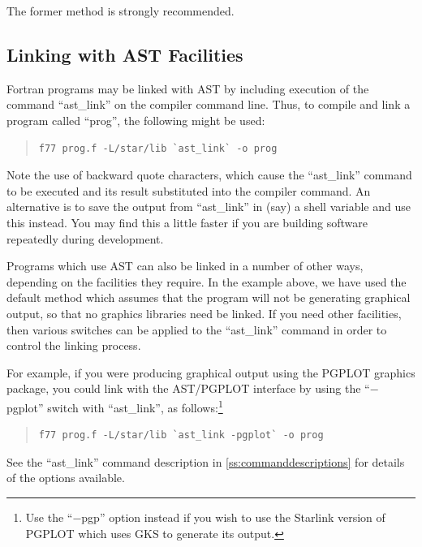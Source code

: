 \documentclass[twoside,11pt]{article}
\newcommand{\htmlref}[2]{#1}
\newcommand{\appref}[1]{Appendix~\ref{#1}}
\renewcommand{\appref}[1]{\ref{#1}}
\begin{document}
The former method is strongly recommended.

\subsection{\label{ss:linking}Linking with AST Facilities}

Fortran programs may be linked with AST by including execution of the
command ``\htmlref{ast\_link}{ast_link}'' on the compiler command line. Thus, to compile
and link a program called ``prog'', the following might be used:

\begin{quote}
\small
\begin{verbatim}
f77 prog.f -L/star/lib `ast_link` -o prog
\end{verbatim}
\normalsize
\end{quote}

Note the use of backward quote characters, which cause the
``ast\_link'' command to be executed and its result substituted into
the compiler command. An alternative is to save the output from
``ast\_link'' in (say) a shell variable and use this instead. You may
find this a little faster if you are building software repeatedly
during development.

Programs which use AST can also be linked in a number of other ways,
depending on the facilities they require. In the example above, we
have used the default method which assumes that the program will not
be generating graphical output, so that no graphics libraries need be
linked. If you need other facilities, then various switches can be
applied to the ``ast\_link'' command in order to control the linking
process.

For example, if you were producing graphical output using the PGPLOT
graphics package, you could link with the AST/PGPLOT interface by
using the ``$-$pgplot'' switch with ``ast\_link'', as
follows:\footnote{Use the ``$-$pgp'' option instead if you wish to use
the Starlink version of PGPLOT which uses GKS to generate its output.}

\begin{quote}
\small
\begin{verbatim}
f77 prog.f -L/star/lib `ast_link -pgplot` -o prog
\end{verbatim}
\normalsize
\end{quote}

See the ``ast\_link'' command description in
\appref{ss:commanddescriptions} for details of the options available.
\end{document}
